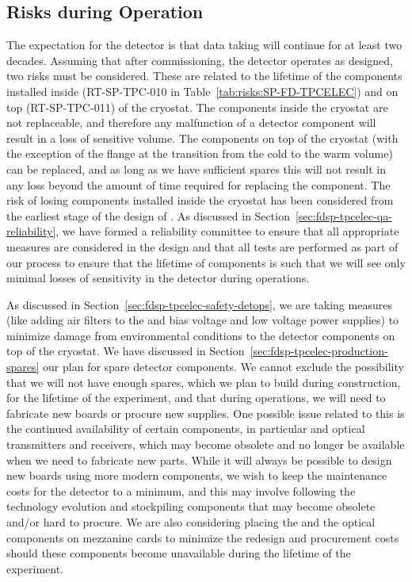 \subsection{Risks during Operation}
\label{sec:fdsp-tpcelec-risks-operations}

The expectation for the  detector is that data taking will continue
for at least two decades. Assuming that after commissioning, the
detector operates as designed, two risks must be considered.
These are related to the lifetime of the  components
installed inside (RT-SP-TPC-010 in Table~\ref{tab:risks:SP-FD-TPCELEC}) and on top (RT-SP-TPC-011)
of the cryostat. The components inside the cryostat are not replaceable,
and therefore any malfunction of a detector component will result in
a loss of sensitive volume. The components on top of the cryostat
(with the exception of the flange at the transition from the cold to
the warm volume) can be replaced, and as long as we have sufficient
spares this will not result in any loss beyond the amount 
of time required for replacing the component. The risk of losing components installed inside the cryostat has been considered
from the earliest stage of the design of . As discussed
in Section~\ref{sec:fdsp-tpcelec-qa-reliability}, we have formed a 
reliability committee to ensure that all appropriate measures
are considered in the design and that all tests are performed
as part of our  process to ensure that the lifetime of components is
such that we will see only minimal losses of sensitivity in the 
detector during operations. 

As discussed in Section~\ref{sec:fdsp-tpcelec-safety-detops}, we
are taking measures (like adding air filters to the
 and bias voltage and low voltage power supplies) to
minimize damage from environmental conditions to the 
detector components on top of the cryostat. We have discussed in
Section~\ref{sec:fdsp-tpcelec-production-spares} our plan for 
spare detector components. We cannot exclude the possibility that we will not have enough
spares, which we plan to build during construction, for the lifetime of the experiment, and that during 
operations, we will need to fabricate new boards or procure new
supplies. One possible issue related to this is the 
continued availability of certain components, in particular
 and optical transmitters and receivers, which may 
become obsolete and no longer be available when we need to fabricate new
parts. While it will always be 
possible to design new boards using more modern components, we
wish to keep the maintenance costs for the detector to a minimum,
and this may involve following the technology evolution and stockpiling components that may become obsolete
and/or hard to procure. We are also considering placing the
 and the optical components on mezzanine cards
to minimize the redesign and procurement costs should these 
components become unavailable during the lifetime of the experiment.
